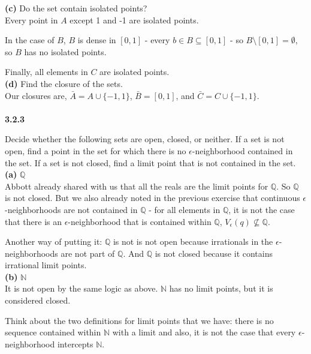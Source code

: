 \textbf{(c)} Do the set contain isolated points?
\\


Every point in $A$ except 1 and -1 are isolated points.

In the case of $B$, $B$ is dense in $[0,1]$ - every $b\in B \subseteq [0,1]$ - so $B \setminus [0,1] = \emptyset$, so
$B$ has no isolated points.

Finally, all elements in $C$ are isolated points.
\\

\textbf{(d)} Find the closure of the sets.
\\

Our closures are, $\bar{A} = A \cup \{-1, 1\}$, $\bar{B} = [0,1]$, and $\bar{C} = C \cup \{-1, 1\}$.
\\~\\


\label{abbott:3.2.3}
\textbf{3.2.3}

Decide whether the following sets are open, closed, or neither.
If a set is not open, find a point in the set for which there is no $\epsilon$-neighborhood contained in the set.
If a set is not closed, find a limit point that is not contained in the set. 
\\

\textbf{(a)} $\mathbb{Q}$
\\

Abbott already shared with us that all the reals are the limit points for $\mathbb{Q}$.
So $\mathbb{Q}$ is not closed.
But we also already noted in the previous exercise that continuous $\epsilon$-neighborhoods are not contained in
$\mathbb{Q}$ - for all elements in $\mathbb{Q}$, it is not the case that there is an $\epsilon$-neighborhood
that is contained within $\mathbb{Q}$, $V_\epsilon (q) \not\subseteq \mathbb{Q}$.

Another way of putting it: $\mathbb{Q}$ is not is not open because irrationals in the $\epsilon$-neighborhoods
are not part of $\mathbb{Q}$. And $\mathbb{Q}$ is not closed because it contains irrational limit points.
\\

\textbf{(b)} $\mathbb{N}$
\\

It is not open by the same logic as above.
$\mathbb{N}$ has no limit points, but it is considered closed.

Think about the two definitions for limit points that we have: there is no sequence contained within $\mathbb{N}$
with a limit and also, it is not the case that every $\epsilon$-neighborhood intercepts $\mathbb{N}$.
\\

